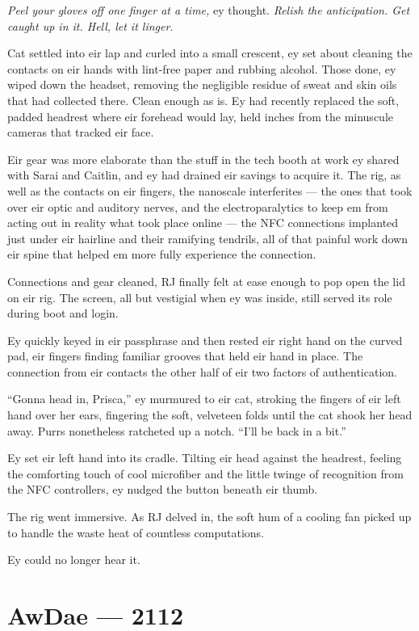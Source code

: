 \emph{Peel your gloves off one finger at a time,} ey thought. \emph{Relish the anticipation. Get caught up in it. Hell, let it linger.}

Cat settled into eir lap and curled into a small crescent, ey set about cleaning the contacts on eir hands with lint-free paper and rubbing alcohol. Those done, ey wiped down the headset, removing the negligible residue of sweat and skin oils that had collected there. Clean enough as is. Ey had recently replaced the soft, padded headrest where eir forehead would lay, held inches from the minuscule cameras that tracked eir face.

Eir gear was more elaborate than the stuff in the tech booth at work ey shared with Sarai and Caitlin, and ey had drained eir savings to acquire it. The rig, as well as the contacts on eir fingers, the nanoscale interferites --- the ones that took over eir optic and auditory nerves, and the electroparalytics to keep em from acting out in reality what took place online --- the NFC connections implanted just under eir hairline and their ramifying tendrils, all of that painful work down eir spine that helped em more fully experience the connection.

Connections and gear cleaned, RJ finally felt at ease enough to pop open the lid on eir rig. The screen, all but vestigial when ey was inside, still served its role during boot and login.

Ey quickly keyed in eir passphrase and then rested eir right hand on the curved pad, eir fingers finding familiar grooves that held eir hand in place. The connection from eir contacts the other half of eir two factors of authentication.

``Gonna head in, Prisca,'' ey murmured to eir cat, stroking the fingers of eir left hand over her ears, fingering the soft, velveteen folds until the cat shook her head away. Purrs nonetheless ratcheted up a notch. ``I'll be back in a bit.''

Ey set eir left hand into its cradle. Tilting eir head against the headrest, feeling the comforting touch of cool microfiber and the little twinge of recognition from the NFC controllers, ey nudged the button beneath eir thumb.

The rig went immersive. As RJ delved in, the soft hum of a cooling fan picked up to handle the waste heat of countless computations.

Ey could no longer hear it.

\chapter*{AwDae — 2112}

